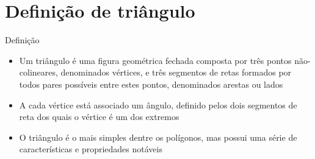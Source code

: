 \section{Definição de triângulo}

\begin{frame}[fragile]{Definição}

    \begin{itemize}
        \item Um triângulo é uma figura geométrica fechada composta por três pontos não-colineares, 
            denominados vértices, e três segmentos de retas formados por todos pares possíveis entre 
            estes pontos, denominados arestas ou lados
        \pause

        \item A cada vértice está associado um ângulo, definido pelos dois segmentos de reta
            dos quais o vértice é um dos extremos
        \pause

        \item O triângulo é o mais simples dentre os polígonos, mas possui uma série de
            características e propriedades notáveis
        \pause

    \end{itemize}

    \begin{figure}
        \centering


    \end{figure}
\end{frame}

